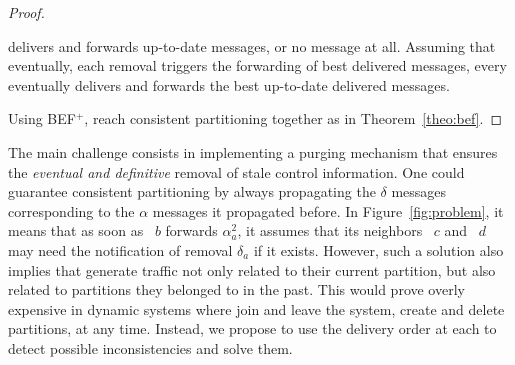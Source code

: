 \begin{proof}
\begin{asparadesc}
    delivers and forwards up-to-date messages, or no message at
    all. Assuming that eventually, each removal triggers the
    forwarding of best delivered messages, every \process eventually
    delivers and forwards the best up-to-date delivered messages.
  \end{asparadesc}
  Using BEF$^+$, \processes reach consistent partitioning together as
  in Theorem~\ref{theo:bef}.
\end{proof}


The main challenge consists in implementing a purging mechanism that
ensures the \emph{eventual and definitive} removal of stale control
information. One could guarantee consistent partitioning by always
propagating the $\delta$ messages corresponding to the $\alpha$
messages it propagated before. In Figure~\ref{fig:problem}, it means
that as soon as \Process~$b$ forwards $\alpha_a^2$, it assumes that
its neighbors \Process~$c$ and \Process~$d$ may need the notification
of removal $\delta_a$ if it exists. However, such a solution also
implies that \processes generate traffic not only related to their
current partition, but also related to partitions they belonged to in
the past. This would prove overly expensive in dynamic systems where
\processes join and leave the system, create and delete partitions, at
any time.  Instead, we propose to use the delivery order at each
\process to detect possible inconsistencies and solve them.


